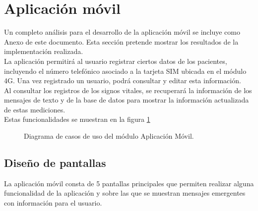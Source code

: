 \section{Aplicación móvil}

Un completo análisis para el desarrollo de la aplicación móvil se incluye como Anexo de este documento. Esta sección pretende mostrar los resultados de la implementación realizada. \\

La aplicación permitirá al usuario registrar ciertos datos de los pacientes, incluyendo el número telefónico asociado a la tarjeta SIM ubicada en el módulo 4G. Una vez registrado un usuario, podrá consultar y editar esta información. \\

Al consultar los registros de los signos vitales, se recuperará la información de los mensajes de texto y de la base de datos para mostrar la información actualizada de estas mediciones. \\

Estas funcionalidades se muestran en la figura \ref{fig:casosUso:AplicacionResumen}

\begin{figure}[htpb!]
	\begin{center}
		\caption{Diagrama de casos de uso del módulo Aplicación Móvil. \label{fig:casosUso:AplicacionResumen}}
	\end{center}
\end{figure}

\subsection{Diseño de pantallas}

La aplicación móvil consta de 5 pantallas principales que permiten realizar alguna funcionalidad de la aplicación y sobre las que se muestran mensajes emergentes con información para el usuario. \\


